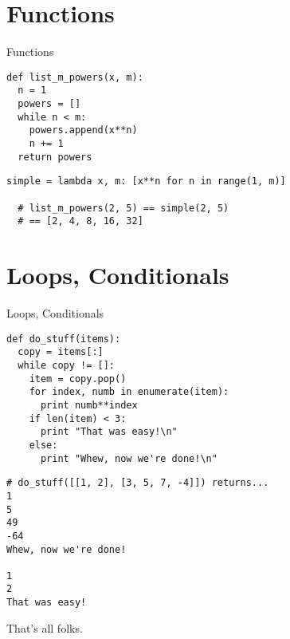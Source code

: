 \documentclass{beamer}
\begin{document}
\section{Functions}

\begin{frame}[fragile]{Functions}
 
\begin{verbatim}
def list_m_powers(x, m):
  n = 1
  powers = []
  while n < m:
    powers.append(x**n)
    n += 1
  return powers
\end{verbatim}
\pause
\begin{verbatim}
simple = lambda x, m: [x**n for n in range(1, m)]

  # list_m_powers(2, 5) == simple(2, 5) 
  # == [2, 4, 8, 16, 32]
\end{verbatim}

\end{frame}

\section{Loops, Conditionals}

\begin{frame}[fragile]{Loops, Conditionals}
 
\begin{verbatim}
def do_stuff(items):
  copy = items[:]
  while copy != []:
    item = copy.pop()
    for index, numb in enumerate(item):
      print numb**index
    if len(item) < 3:
      print "That was easy!\n"
    else:
      print "Whew, now we're done!\n"
\end{verbatim}

\end{frame}

\begin{frame}[fragile]

\begin{verbatim}
# do_stuff([[1, 2], [3, 5, 7, -4]]) returns...
1
5
49
-64
Whew, now we're done!

1
2
That was easy!
\end{verbatim}

\end{frame}


\begin{frame}
That's all folks.
\end{frame}
\end{document}
